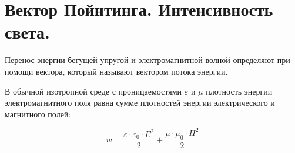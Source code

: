 \section{Вектор Пойнтинга. Интенсивность света.}

Перенос энергии бегущей упругой и электромагнитной волной определяют при помощи вектора, который называют вектором потока энергии.

В обычной изотропной среде с проницаемостями $\varepsilon$ и $\mu$ плотность энергии электромагнитного поля равна сумме плотностей энергии электрического и магнитного полей:

\begin{equation*}
w = \frac{\varepsilon \cdot \varepsilon_0 \cdot E^2}{2}+\frac{\mu \cdot \mu_0 \cdot H^2}{2}
\end{equation*}